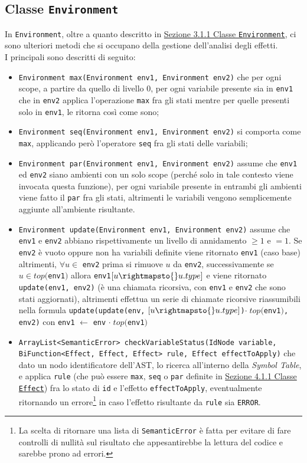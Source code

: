 \documentclass[../report.tex]{subfiles}
\begin{document}
\subsection[Classe Environment]{Classe \texttt{Environment}}\label{ss:environment-effetti}
In \verb|Environment|, oltre a quanto descritto in \hyperref[ss:environment]{Sezione 3.1.1 Classe \texttt{Environment}}, ci sono ulteriori metodi che si occupano della gestione dell'analisi degli effetti.\\
\noindent
I principali sono descritti di seguito:
\begin{itemize}
    \item \verb|Environment max(Environment env1, Environment env2)| che per ogni scope, a partire da quello di livello $0$, per ogni variabile presente sia in \verb|env1| che in \verb|env2| applica l'operazione \verb|max| fra gli stati mentre per quelle presenti solo in \verb|env1|, le ritorna così come sono;
    \item \verb|Environment seq(Environment env1, Environment env2)| si comporta come \verb|max|, applicando però l'operatore \verb|seq| fra gli stati delle variabili;
    \item \verb|Environment par(Environment env1, Environment env2)| assume che \verb|env1| ed \verb|env2| siano ambienti con un solo scope (perché solo in tale contesto viene invocata questa funzione), per ogni variabile presente in entrambi gli ambienti viene fatto il \verb|par| fra gli stati, altrimenti le variabili vengono semplicemente aggiunte all'ambiente risultante.
    \item \verb|Environment update(Environment env1, Environment env2)| assume che \verb|env1| e \verb|env2| abbiano rispettivamente un livello di annidamento $\geq{} 1$ e $= 1$.
    Se \verb|env2| è vuoto oppure non ha variabili definite viene ritornato \verb|env1| (caso base) altrimenti, $\forall u \in$ \verb|env2| prima si rimuove $u$ da \verb|env2|, successivamente se $u \in top($\verb|env1|$)$ allora \verb|env1|$[u \rightmapsto{} u.type]$ e viene ritornato \verb|update(env1, env2)| (è una chiamata ricorsiva, con \verb|env1| e \verb|env2| che sono stati aggiornati), altrimenti effettua un serie di chiamate ricorsive riassumibili nella formula \verb|update(update(env,| $[u \rightmapsto{} u.type]$\verb|)|$\cdot{}\; top($\verb|env1|$)$\verb|, env2)| con \verb|env1| $\leftarrow$ \verb|env| $\cdot{}\; top($\verb|env1|$)$
    \item \verb|ArrayList<SemanticError> checkVariableStatus(IdNode variable,|\\ \verb|BiFunction<Effect, Effect, Effect> rule, Effect effectToApply)| che dato un nodo identificatore dell'AST, lo ricerca all'interno della \textit{Symbol Table}, e applica \verb|rule| (che può essere \verb|max|, \verb|seq| o \verb|par| definite in \hyperref[ss:effect-effetti]{Sezione 4.1.1 Classe \texttt{Effect}}) fra lo stato di \verb|id| e l'effetto \verb|effectToApply|, eventualmente ritornando un errore\footnote{La scelta di ritornare una lista di \texttt{SemanticError} è fatta per evitare di fare controlli di nullità sul risultato che appesantirebbe la lettura del codice e sarebbe prono ad errori.} in caso l'effetto risultante da \verb|rule| sia \verb|ERROR|.
\end{itemize}
\end{document}
